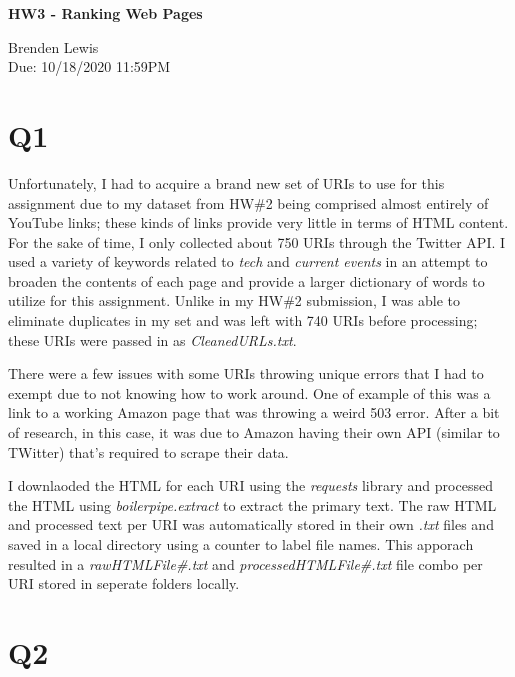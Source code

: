 \documentclass[12pt]{article}
\begin{document}
\begin{centering}
{\large\textbf{HW3 - Ranking Web Pages}}

Brenden Lewis\\                     
Due: 10/18/2020 11:59PM\\                      
\end{centering}

\section*{Q1}
Unfortunately, I had to acquire a brand new set of URIs to use for this assignment due to my dataset from HW\#2 being comprised almost entirely of YouTube links; these kinds of links provide very little in terms of HTML content. For the sake of time, I only collected about 750 URIs through the Twitter API. I used a variety of keywords related to \emph{tech} and \emph{current events} in an attempt to broaden the contents of each page and provide a larger dictionary of words to utilize for this assignment. Unlike in my HW\#2 submission, I was able to eliminate duplicates in my set and was left with 740 URIs before processing; these URIs were passed in as \emph{CleanedURLs.txt}. 

There were a few issues with some URIs throwing unique errors that I had to exempt due to not knowing how to work around. One of example of this was a link to a working Amazon page that was throwing a weird 503 error. After a bit of research, in this case, it was due to Amazon having their own API (similar to TWitter) that's required to scrape their data. 

\par I downlaoded the HTML for each URI using the \emph{requests} library and processed the HTML using \emph{boilerpipe.extract} to extract the primary text. The raw HTML and processed text per URI was automatically stored in their own \emph{.txt} files and saved in a local directory using a counter to label file names. This apporach resulted in a \emph{rawHTMLFile\#.txt} and \emph{processedHTMLFile\#.txt} file combo per URI stored in seperate folders locally.



\section*{Q2}
\end{document}
